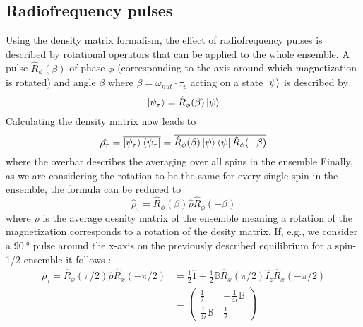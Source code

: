         \subsection{Radiofrequency pulses}
        \label{section:theory:RFPulses}
            Using the density matrix formalism, the effect of radiofrequency pulses is described by rotational operators that can be
            applied to the whole ensemble. A pulse $\hat R_\phi(\beta)$ of phase $\phi$ (corresponding
            to the axis around which magnetization is rotated) and angle $\beta$ where
            $\beta=\omega_{nut} \cdot \tau_p$ acting on a state $\ket\psi$ is described by 
            \begin{equation}
                \ket{\psi_\tau}= \hat R_\phi(\beta)\ket\psi
            \end{equation}
            Calculating the density matrix now leads to
            \begin{equation}
                \hat {\rho_\tau} = \overline{\ket{\psi_\tau}\bra{\psi_\tau}} = \overline{\hat
                    R_{\phi}(\beta)\ket\psi\bra\psi \hat R_\phi(-\beta)}
            \end{equation}
            where the overbar describes the averaging over all spins in the ensemble \cite{popov_modern_1990, chizhik_magnetic_2014} Finally, as we are considering the rotation to be the same for every single spin in the ensemble, the formula can be reduced to
            \begin{equation}
                \hat\rho_\tau = \hat R_\phi(\beta) \hat \rho \hat R_\phi(-\beta)
            \end{equation}
            where $\rho$ is the average desnity matrix of the ensemble meaning a rotation of the magnetization corresponds to a rotation of the desity matrix. If, e.g., we consider a $\SI{90}{\degree}$ pulse around the x-axis on the previously described equilibrium for a spin-1/2 ensemble it follows \cite{hosur_scaling_1990, levitt_spin_nodate}:
            \begin{equation}
                \begin{split}
                    \hat\rho_\tau = \hat R_x(\pi/2)\hat\rho\hat R_x(-\pi/2) &= \frac{1}{2} \hat 1 +
                    \frac{1}{2} \mathbb{B}\hat R_x(\pi/2) \hat I_z \hat R_x(-\pi/2)\\
                    &=
                    \begin{pmatrix}
                        \frac{1}{2} & -\frac{1}{4i}\mathbb{B}\\
                        \frac{1}{4i}\mathbb{B}\ & \frac{1}{2}
                    \end{pmatrix}
                \end{split}
            \end{equation}
